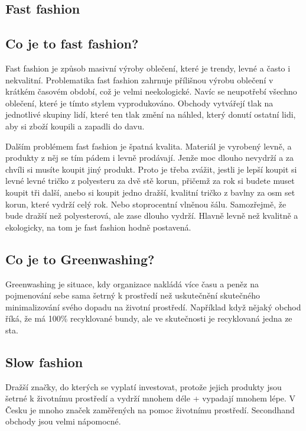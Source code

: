 \documentclass[12pt, a4paper]{article}
\begin{document}
	\begin{multicols*}{2}
		\setlength{\columnseprule}{1pt}

		\begin{center}\section*{Fast fashion}\end{center}
		\subsection*{Co je to fast fashion?}
		Fast fashion je způsob masivní výroby oblečení, které je trendy, levné a často i nekvalitní. Problematika fast fashion zahrnuje přílišnou výrobu oblečení v krátkém časovém období, což je velmi neekologické. Navíc se neupotřebí všechno oblečení, které je tímto stylem vyprodukováno. Obchody vytvářejí tlak na jednotlivé skupiny lidí, které ten tlak změní na náhled, který donutí ostatní lidi, aby si zboží koupili a zapadli do davu.

		Dalším problémem fast fashion je špatná kvalita. Materiál je vyrobený levně, a produkty z něj se tím pádem i levně prodávají. Jenže moc dlouho nevydrží a za chvíli si musíte koupit jiný produkt. Proto je třeba zvážit, jestli je lepší koupit si levné levné tričko z polyesteru za dvě stě korun, přičemž za rok si budete muset koupit tři další, anebo si koupit jedno dražší, kvalitní tričko z bavlny za osm set korun, které vydrží celý rok. Nebo stoprocentní vlněnou šálu. Samozřejmě, že bude dražší než polyesterová, ale zase dlouho vydrží. Hlavně levně než kvalitně a ekologicky, na tom je fast fashion hodně postavená.

		\subsection*{Co je to Greenwashing?}
		Greenwashing je situace, kdy organizace nakládá více času a peněz na pojmenování sebe sama šetrný k prostředí než uskutečnění skutečného minimalizování svého dopadu na životní prostředí. Například když nějaký obchod říká, že má 100\% recyklované bundy, ale ve skutečnosti je recyklovaná jedna ze sta.

		\subsection*{Slow fashion}
		Dražší značky, do kterých se vyplatí investovat, protože jejich produkty jsou šetrné k životnímu prostředí a vydrží mnohem déle + vypadají mnohem lépe. V Česku je mnoho značek zaměřených na pomoc životnímu prostředí. Secondhand obchody jsou velmi nápomocné.


\end{multicols*}
\end{document}
